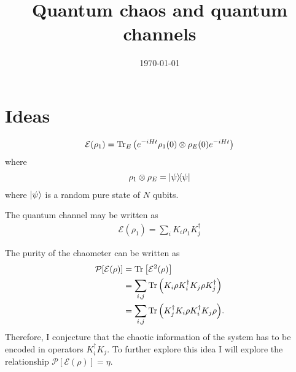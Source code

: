 \documentclass[10pt,letterpaper]{article}
\title{Quantum chaos and quantum channels}
\author{}
\date{\today}
\newcommand{\mcE}{\mathcal E}
\newcommand{\mcP}{\mathcal P}
\begin{document}
\maketitle

\section{Ideas}
\begin{align}
\mcE(\rho_1) = 
\Tr_E\qty(e^{-iHt} \rho_1(0)\otimes \rho_E(0) e^{-iHt})
\end{align}
where
\begin{align}
\rho_1 \otimes \rho_E = 
\dyad{\psi}
\end{align}
where $\ket{\psi}$ is a random pure state of $N$ qubits.

The quantum channel may be written as 
\begin{align}
\mcE(\rho_1) = 
\sum_i K_i \rho_1 K_j^\dagger
\end{align}

The purity of the chaometer can be written as 
\begin{align}
\mcP [\mcE(\rho)] &=
\Tr \qty[\mcE^2(\rho)] \\
&= \sum_{i,j}
\Tr \qty( K_i \rho K_i^\dagger K_j \rho K_j^\dagger) \\
&= \sum_{i,j}
\Tr \qty( K_j^\dagger K_i \rho K_i^\dagger K_j \rho).
\end{align}
Therefore, I conjecture that the chaotic information of the system has to be 
encoded in operators $K_i^\dagger K_j$. To further explore this idea 
I will explore the relationship $\mcP [\mcE(\rho)]  = \eta $.
\end{document}
